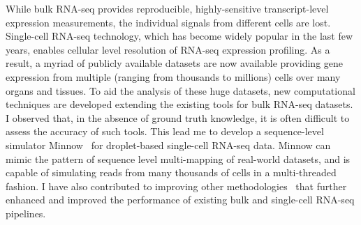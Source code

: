 \documentclass[11pt,a4paper,sans]{moderncv}
\begin{document}
\setlength{\parindent}{5ex}
While bulk RNA-seq provides reproducible, highly-sensitive transcript-level expression measurements, the individual signals from different cells are lost. Single-cell RNA-seq technology, which has become widely popular in the last few years, enables cellular level resolution of RNA-seq expression profiling. As a result, a myriad of publicly available datasets are now available providing gene expression from multiple (ranging from thousands to millions) cells over many organs and tissues. To aid the analysis of these huge datasets, new computational techniques are developed extending the existing tools for bulk RNA-seq datasets. I observed that, in the absence of ground truth knowledge, it is often difficult to assess the accuracy of such tools. This lead me to develop a sequence-level simulator Minnow~\cite{minnow} for droplet-based single-cell RNA-seq data. Minnow can mimic the pattern of sequence level multi-mapping of real-world datasets, and is capable of simulating reads from many thousands of cells in a multi-threaded fashion. I have also contributed to improving other methodologies~\cite{mappingsmatter,rapclust,alevin2,selaln} that further enhanced and improved the performance of existing bulk and single-cell RNA-seq pipelines.
\end{document}
